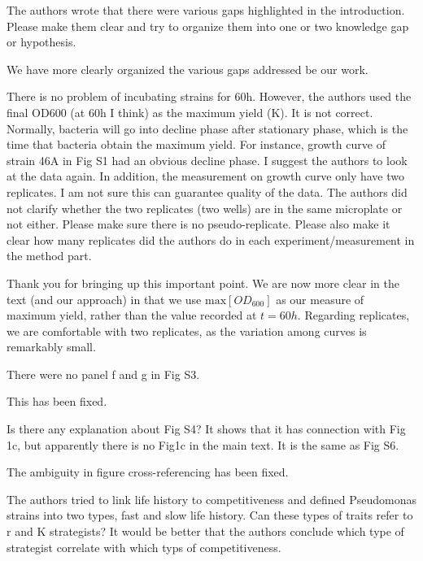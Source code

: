 \documentclass[11pt,]{article}
\begin{document}
\begin{blockquote}
The authors wrote that there were various gaps highlighted in the
introduction. Please make them clear and try to organize them into one
or two knowledge gap or hypothesis.
\end{blockquote}

We have more clearly organized the various gaps addressed be our work.

\begin{blockquote}
There is no problem of incubating strains for 60h. However, the authors
used the final OD600 (at 60h I think) as the maximum yield (K). It is
not correct. Normally, bacteria will go into decline phase after
stationary phase, which is the time that bacteria obtain the maximum
yield. For instance, growth curve of strain 46A in Fig S1 had an obvious
decline phase. I suggest the authors to look at the data again. In
addition, the measurement on growth curve only have two replicates. I am
not sure this can guarantee quality of the data. The authors did not
clarify whether the two replicates (two wells) are in the same
microplate or not either. Please make sure there is no pseudo-replicate.
Please also make it clear how many replicates did the authors do in each
experiment/measurement in the method part.
\end{blockquote}

Thank you for bringing up this important point. We are now more clear in
the text (and our approach) in that we use \(\text{max}[OD_{600}]\) as
our measure of maximum yield, rather than the value recorded at
\(t = 60 h\). Regarding replicates, we are comfortable with two
replicates, as the variation among curves is remarkably small.

\begin{blockquote}
There were no panel f and g in Fig S3.
\end{blockquote}

This has been fixed.

\begin{blockquote}
Is there any explanation about Fig S4? It shows that it has connection
with Fig 1c, but apparently there is no Fig1c in the main text. It is
the same as Fig S6.
\end{blockquote}

The ambiguity in figure cross-referencing has been fixed.

\begin{blockquote}
The authors tried to link life history to competitiveness and defined
Pseudomonas strains into two types, fast and slow life history. Can
these types of traits refer to r and K strategists? It would be better
that the authors conclude which type of strategist correlate with which
typs of competitiveness.
\end{blockquote}
\end{document}
